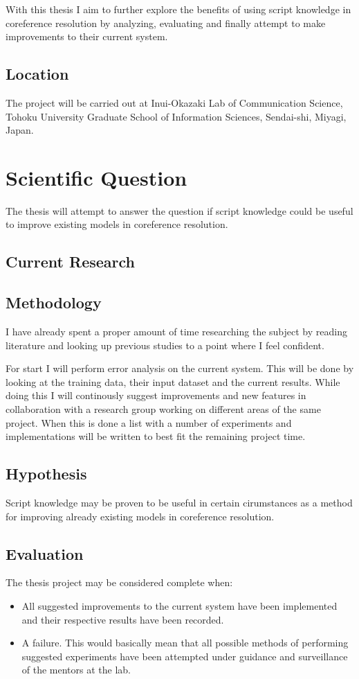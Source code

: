 \documentclass{article}
\begin{document}
With this thesis I aim to further explore the benefits of using script knowledge in coreference resolution by analyzing, evaluating and finally attempt to make improvements to their current system.
\subsection{Location}
The project will be carried out at Inui-Okazaki Lab of Communication Science, Tohoku University Graduate School of Information Sciences, Sendai-shi, Miyagi, Japan.
\section{Scientific Question}
The thesis will attempt to answer the question if script knowledge could be useful to improve existing models in coreference resolution.
\subsection{Current Research}

\subsection{Methodology}
I have already spent a proper amount of time researching the subject by reading literature and looking up previous studies to a point where I feel confident.

For start I will perform error analysis on the current system. This will be done by looking at the training data, their input dataset and the current results. While doing this I will continously suggest improvements and new features in collaboration with a research group working on different areas of the same project. When this is done a list with a number of experiments and implementations will be written to best fit the remaining project time.
\subsection{Hypothesis}
Script knowledge may be proven to be useful in certain cirumstances as a method for improving already existing models in coreference resolution.
\subsection{Evaluation}
The thesis project may be considered complete when:
\begin{itemize}
	\item All suggested improvements to the current system have been implemented and their respective results have been recorded.
	\item A failure. This would basically mean that all possible methods of performing suggested experiments have been attempted under guidance and surveillance of the mentors at the lab.
\end{itemize}
\end{document}
